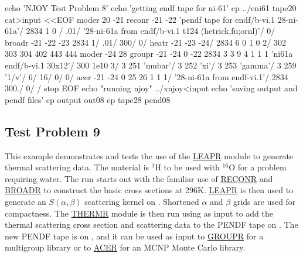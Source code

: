 \small
\begin{ccode}

echo 'NJOY Test Problem 8'
echo 'getting endf tape for ni-61'
cp ../eni61 tape20
cat>input <<EOF
 moder
 20 -21
 reconr
 -21 -22
 'pendf tape for endf/b-vi.1 28-ni-61a'/
 2834 1 0 /
 .01/
 '28-ni-61a from endf/b-vi.1 t124 (hetrick,fu;ornl)'/
 0/
 broadr
 -21 -22 -23
 2834 1/
 .01/
 300/
 0/
 heatr
 -21 -23 -24/
 2834 6 0 1 0 2/
 302 303 304 402 443 444
 moder
 -24 28
 groupr
 -21 -24 0 -22
 2834 3 3 9 4 1 1 1
 'ni61a endf/b-vi.1 30x12'/
 300
 1e10
  3/
  3 251 'mubar'/
  3 252 'xi'/
  3 253 'gamma'/
  3 259 '1/v'/
  6/
  16/
 0/
 0/
 acer
 -21 -24 0 25 26
 1 1 1/
 '28-ni-61a from endf-vi.1'/
 2834 300./
 0/
 /
 stop
EOF
echo "running njoy"
../xnjoy<input
echo 'saving output and pendf files'
cp output out08
cp tape28 pend08

\end{ccode}
\normalsize

\subsection{Test Problem 9}
\label{ssMandT_9}

This example demonstrates and tests the use of the
\hyperlink{sLEAPRhy}{LEAPR} module
to generate thermal scattering data.  The material is $^{1}$H
to be used with $^{16}$O for a problem requiring water.  The
run starts out with the familiar use of
\hyperlink{sRECONRhy}{RECONR} and
\hyperlink{sBROADRhy}{BROADR} to construct the basic cross sections
at 296K.  \hyperlink{sLEAPRhy}{LEAPR} is then
used to generate an $S(\alpha,\beta)$ scattering kernel on
.  Shortened $\alpha$ and $\beta$ grids are used
for compactness.  The \hyperlink{sTHERMRhy}{THERMR}
module is then run using 
as input to add the thermal scattering cross section and
scattering data to the PENDF tape on .  The
new PENDF tape is on , and it can be used as
input to \hyperlink{sGROUPRhy}{GROUPR} for a multigroup library
or to \hyperlink{sACERhy}{ACER} for an
MCNP Monte Carlo library.

